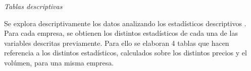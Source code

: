 \documentclass[]{article}
\newenvironment{Shaded}{\begin{snugshade}}{\end{snugshade}}
\newcommand{\DataTypeTok}[1]{\textcolor[rgb]{0.13,0.29,0.53}{#1}}
\newcommand{\DecValTok}[1]{\textcolor[rgb]{0.00,0.00,0.81}{#1}}
\newcommand{\KeywordTok}[1]{\textcolor[rgb]{0.13,0.29,0.53}{\textbf{#1}}}
\newcommand{\NormalTok}[1]{#1}
\newcommand{\OperatorTok}[1]{\textcolor[rgb]{0.81,0.36,0.00}{\textbf{#1}}}
\newcommand{\OtherTok}[1]{\textcolor[rgb]{0.56,0.35,0.01}{#1}}
\newcommand{\StringTok}[1]{\textcolor[rgb]{0.31,0.60,0.02}{#1}}
\begin{document}
\emph{Tablas descriptivas}

Se explora descriptivamente los datos analizando los estadísticos
descriptivos . Para cada empresa, se obtienen los distintos estadísticos
de cada una de las variables descritas previamente. Para ello se
elaboran 4 tablas que hacen referencia a los distintos estadísticos,
calculados sobre los distintos precios y el volúmen, para una misma
empresa.

\begin{Shaded}
\end{Shaded}
\end{document}
